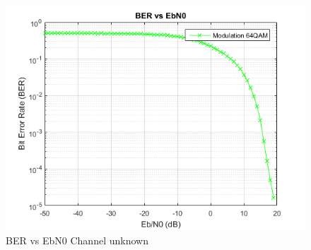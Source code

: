 \documentclass[a4paper]{article}
\begin{document}
        \begin{figure}
		\centering
		\includegraphics[scale=0.6]{figures/NoChannelBER.png}
		\vspace{-0.2cm}
		\centering
		\caption{BER vs EbN0 Channel unknown}
		\label{fig:ber_awgn_nochannel}
	\end{figure}
    
  
    
\end{document}

